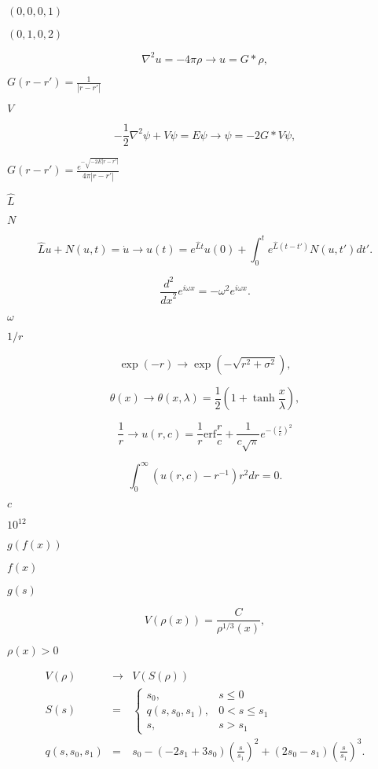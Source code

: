 \documentclass{article}
\begin{document}
$(0,0,0,1)$
\pagebreak

$(0,1,0,2)$
\pagebreak

\[ \nabla^{2} u = -4\pi\rho \to u=G \ast \rho, \]
\pagebreak

$G(r-r')=\frac{1}{|r-r'|}$
\pagebreak

$V$
\pagebreak

\[ - \frac{1}{2} \nabla^{2} \psi + V\psi = E \psi \to \psi = -2G \ast V\psi, \]
\pagebreak

$G(r-r')=\frac{e^{-\sqrt{-2E|r-r'|}}}{4\pi |r-r'|} $
\pagebreak

$\hat{L}$
\pagebreak

$N$
\pagebreak

\[ \hat{L}u + N(u,t) = \dot{u} \to u(t) = e^{\hat{L} t} u(0) + \int _{0}^{t} e^{\hat{L} (t-t')} N(u,t') \mathit{d}t'. \]
\pagebreak

\[ \frac{d^{2}}{\mathit{dx}^{2}}e^{i\omega x}=-\omega ^{2}e^{i\omega x}. \]
\pagebreak

$\omega$
\pagebreak

$1/r$
\pagebreak

\[ \exp(-r) \to \exp (-\sqrt{r^{2}+\sigma ^{2}}), \]
\pagebreak

\[ \theta(x) \to \theta(x, \lambda) = \frac{1}{2} (1 + \tanh\frac{x}{\lambda}), \]
\pagebreak

\[ \frac{1}{r} \to u(r,c) = \frac{1}{r} \mathrm{erf} \frac{r}{c} + \frac{1}{c\sqrt{\pi}} e^{-\left( \frac{r}{c} \right)^{2}} \]
\pagebreak

\[ \int_{0}^{\infty} \left(u(r, c) - r^{-1}\right) r^{2} d\mathit{r} = 0. \]
\pagebreak

$c$
\pagebreak

$10^{12}$
\pagebreak

$g(f(x))$
\pagebreak

$f(x)$
\pagebreak

$g(s)$
\pagebreak

\[ V(\rho(x)) = \frac{C}{\rho^{1/3}(x)}, \]
\pagebreak

$\rho (x)>0$
\pagebreak

\begin{eqnarray*} V(\rho) & \to & V(S(\rho)) \\ S(s) & = & \left\{ \begin{array}{ll} s_{0}, & s\le 0 \\ q(s, s_{0}, s_{1}), & 0 < s \le s_{1} \\ s, & s > s_{1} \end{array} \right. \\ q(s, s_{0}, s_{1}) & = & s_{0} - (-2s_{1} + 3s_{0}) \left( \frac{s}{s_{1}} \right)^{2} + (2s_{0} - s_{1}) \left(\frac{s}{s_{1}}\right)^{3}. \end{eqnarray*}
\pagebreak
\end{document}
